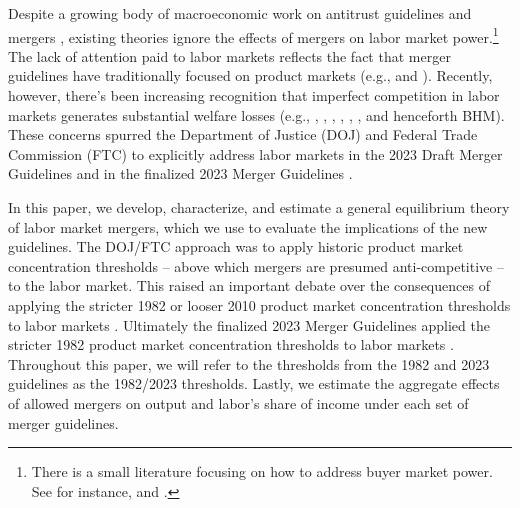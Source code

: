 \documentclass[12pt]{article}
\theoremstyle{prop}
\begin{document}
Despite a growing body of macroeconomic work on antitrust guidelines and mergers \citep[][among~others]{david2021aggregate,cavenaile2021dynamic}, existing theories ignore the effects of mergers on labor market power.\footnote{There is a small literature focusing on how to address buyer market power. See for instance, \citet{Nevo2015monopsony} and \citet{Ho2017monopsony}.} 
The lack of attention paid to labor markets reflects the fact that  merger guidelines have traditionally focused on product markets (e.g., \citet{posner2021antitrust}  and \citet{hovenkamp2022worker}).
Recently, however, there's been increasing recognition that imperfect competition in labor markets generates substantial welfare losses (e.g.,   \citet{azkarate2020aggregate}, \citet{brooks2021exploitation}, \citet{jager2022worker}, \citet{lamadon2022imperfect}, \citet{azar2022estimating}, \citet{yeh2022monopsony}, and \citet{berger2022labor} henceforth BHM). 
These concerns spurred the Department of Justice (DOJ) and Federal Trade Commission (FTC) to explicitly address labor markets in the 2023 Draft Merger Guidelines \citep{doj2023guidelines} and in the finalized 2023 Merger Guidelines \citep{doj2023final}.

In this paper, we develop, characterize, and estimate a general equilibrium theory of labor market mergers, which we use to evaluate the implications of the new guidelines.  
The DOJ/FTC approach was to apply historic product market concentration thresholds  -- above which mergers are presumed anti-competitive -- to the labor market.
This raised an important debate over the consequences of applying the stricter 1982 or looser 2010 product market concentration thresholds to labor markets \citep{berger2023comments}.
Ultimately the finalized 2023 Merger Guidelines applied the stricter 1982 product market concentration thresholds to labor markets \citep{doj2023final}.  
Throughout this paper, we will refer to the thresholds from the 1982 and 2023 guidelines as the 1982/2023 thresholds. Lastly, we estimate the aggregate effects of allowed mergers on output and labor's share of income under each set of merger guidelines.
 
\end{document}
